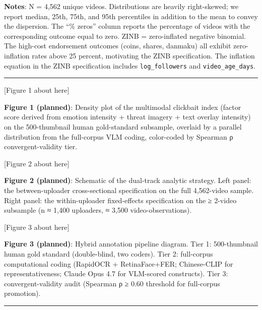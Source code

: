 \documentclass[
  12pt,
]{article}
\begin{document}
\textbf{Notes}: N = 4,562 unique videos. Distributions are heavily
right-skewed; we report median, 25th, 75th, and 95th percentiles in
addition to the mean to convey the dispersion. The ``\% zeros'' column
reports the percentage of videos with the corresponding outcome equal to
zero. ZINB = zero-inflated negative binomial. The high-cost endorsement
outcomes (coins, shares, danmaku) all exhibit zero-inflation rates above
25 percent, motivating the ZINB specification. The inflation equation in
the ZINB specification includes \texttt{log\_followers} and
\texttt{video\_age\_days}.

\begin{center}\rule{0.5\linewidth}{0.5pt}\end{center}

{[}Figure 1 about here{]}

\textbf{Figure 1 (planned)}: Density plot of the multimodal clickbait
index (factor score derived from emotion intensity + threat imagery +
text overlay intensity) on the 500-thumbnail human gold-standard
subsample, overlaid by a parallel distribution from the full-corpus VLM
coding, color-coded by Spearman ρ convergent-validity tier.

{[}Figure 2 about here{]}

\textbf{Figure 2 (planned)}: Schematic of the dual-track analytic
strategy. Left panel: the between-uploader cross-sectional specification
on the full 4,562-video sample. Right panel: the within-uploader
fixed-effects specification on the ≥ 2-video subsample (n ≈ 1,400
uploaders, ≈ 3,500 video-observations).

{[}Figure 3 about here{]}

\textbf{Figure 3 (planned)}: Hybrid annotation pipeline diagram. Tier 1:
500-thumbnail human gold standard (double-blind, two coders). Tier 2:
full-corpus computational coding (RapidOCR + RetinaFace+FER;
Chinese-CLIP for representativeness; Claude Opus 4.7 for VLM-scored
constructs). Tier 3: convergent-validity audit (Spearman ρ ≥ 0.60
threshold for full-corpus promotion).

\begin{center}\rule{0.5\linewidth}{0.5pt}\end{center}
\end{document}
